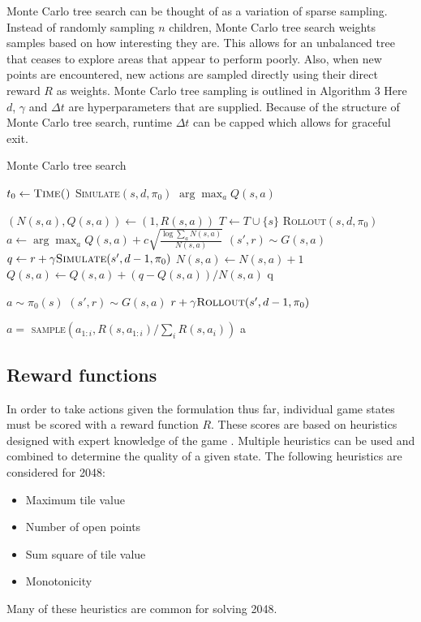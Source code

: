 \documentclass[conference]{IEEEtran}
\begin{document}
Monte Carlo tree search can be thought of as a variation of sparse sampling. Instead of randomly sampling $n$ children, Monte Carlo tree search weights samples based on how interesting they are. This allows for an unbalanced tree that ceases to explore areas that appear to perform poorly. Also, when new points are encountered, new actions are sampled directly using their direct reward $R$ as weights. Monte Carlo tree sampling is outlined in Algorithm 3 \cite{d} Here $d$, $\gamma$ and $\Delta t$ are hyperparameters that are supplied. Because of the structure of Monte Carlo tree search, runtime $\Delta t$ can be capped which allows for graceful exit.
\begin{algorithm}
	\caption{Monte Carlo tree search}
	\begin{algorithmic}[1]
		\State $t_0 \leftarrow \textsc{Time()}$
		\State \textsc{Simulate}$(s,d,\pi_0)$
		\EndWhile
		\State\Return $\arg \max_a Q(s,a)$
		\EndFunction
		
		 
		\EndIf
		\State $(N(s,a),Q(s,a))\leftarrow (1, R(s,a))$
		\EndFor
		\State $T \leftarrow T \cup \{s\}$
		\State \Return \textsc{Rollout}$(s,d,\pi_0)$
		\EndIf
		\State $a\leftarrow \arg\max_a Q(s,a) + c\sqrt{\frac{\log \sum_a N(s,a)}{N(s,a)}}$
		\State $(s',r)\sim G(s,a)$
		\State $q \leftarrow r + \gamma\textsc{Simulate}(s',d-1, \pi_0)$
		\State $N(s,a) \leftarrow N(s,a) + 1$
		\State $Q(s,a) \leftarrow Q(s,a) + (q - Q(s,a)) / N(s,a)$
		\State \Return q
		\EndFunction
		
		 
		\EndIf
		\State $a\sim \pi_0(s)$
		\State $(s',r) \sim G(s,a)$
		\State \Return $r + \gamma\textsc{Rollout}(s',d-1,\pi_0)$
		\EndFunction
		
		\State $a =$ \textsc{sample}$\left( a_{1:i}, R(s,a_{1:i})/\sum_i R(s,a_i) \right)$
		\State\Return a
		\EndFunction
	\end{algorithmic}
\end{algorithm}

\subsection{Reward functions}

In order to take actions given the formulation thus far, individual game states must be scored with a reward function $R$. These scores are based on heuristics designed with expert knowledge of the game \cite{ai}. Multiple heuristics can be used and combined to determine the quality of a given state. The following heuristics are considered for 2048:
\begin{itemize}
	\item Maximum tile value
	\item Number of open points
	\item Sum square of tile value
	\item Monotonicity
\end{itemize}
Many of these heuristics are common for solving 2048\cite{stack}.
\end{document}

